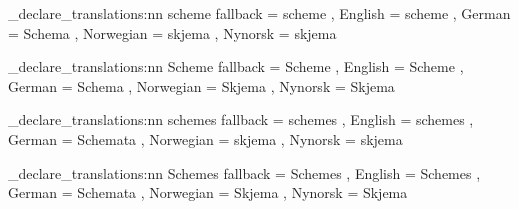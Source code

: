 \chemmacros_declare_translations:nn {scheme}
  {
    fallback  = scheme ,
    English   = scheme ,
    German    = Schema ,
    Norwegian = skjema ,
    Nynorsk   = skjema
  }

\chemmacros_declare_translations:nn {Scheme}
  {
    fallback  = Scheme ,
    English   = Scheme ,
    German    = Schema ,
    Norwegian = Skjema ,
    Nynorsk   = Skjema
  }

\chemmacros_declare_translations:nn {schemes}
  {
    fallback = schemes ,
    English  = schemes ,
    German   = Schemata ,
    Norwegian = skjema ,
    Nynorsk   = skjema
  }

\chemmacros_declare_translations:nn {Schemes}
  {
    fallback = Schemes ,
    English  = Schemes ,
    German   = Schemata ,
    Norwegian = Skjema ,
    Nynorsk   = Skjema
  }
\EndChemCompatibility

\ChemModuleEnd
